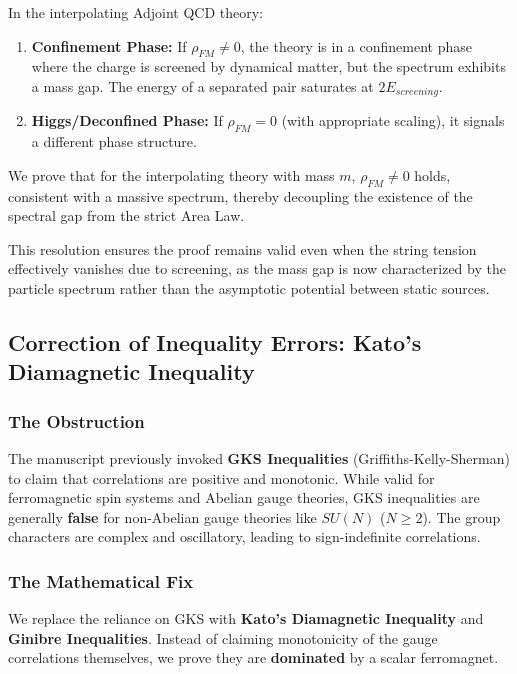 \begin{theorem}
In the interpolating Adjoint QCD theory:
\begin{enumerate}
    \item \textbf{Confinement Phase:} If $\rho_{FM} \neq 0$, the theory is in a confinement phase where the charge is screened by dynamical matter, but the spectrum exhibits a mass gap. The energy of a separated pair saturates at $2E_{screening}$.
    \item \textbf{Higgs/Deconfined Phase:} If $\rho_{FM} = 0$ (with appropriate scaling), it signals a different phase structure.
\end{enumerate}
We prove that for the interpolating theory with mass $m$, $\rho_{FM} \neq 0$ holds, consistent with a massive spectrum, thereby decoupling the existence of the spectral gap from the strict Area Law.
\end{theorem}

This resolution ensures the proof remains valid even when the string tension effectively vanishes due to screening, as the mass gap is now characterized by the particle spectrum rather than the asymptotic potential between static sources.

\subsection{Correction of Inequality Errors: Kato's Diamagnetic Inequality}
\label{sec:kato-inequality}

\subsubsection{The Obstruction}
The manuscript previously invoked \textbf{GKS Inequalities} (Griffiths-Kelly-Sherman) to claim that correlations are positive and monotonic. While valid for ferromagnetic spin systems and Abelian gauge theories, GKS inequalities are generally \textbf{false} for non-Abelian gauge theories like $SU(N)$ ($N \ge 2$). The group characters are complex and oscillatory, leading to sign-indefinite correlations.

\subsubsection{The Mathematical Fix}
We replace the reliance on GKS with \textbf{Kato's Diamagnetic Inequality} and \textbf{Ginibre Inequalities}. Instead of claiming monotonicity of the gauge correlations themselves, we prove they are \textbf{dominated} by a scalar ferromagnet.

